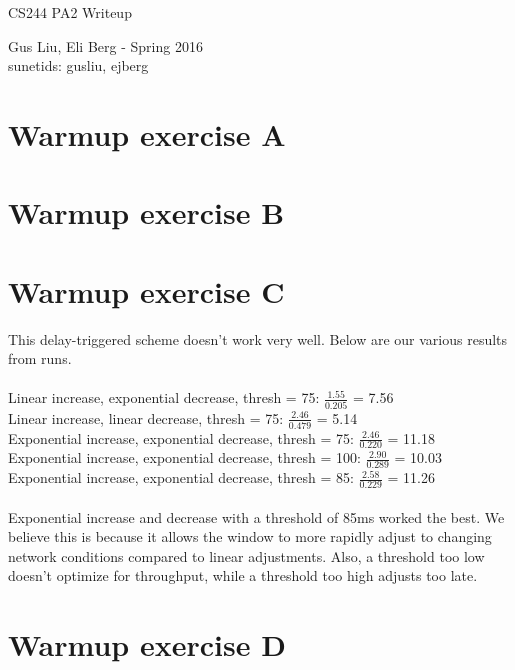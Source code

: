 \documentclass[12pt]{article}
\begin{document}
\begin{center}
{\Large CS244 PA2 Writeup}
\begin{center}
Gus Liu, Eli Berg - Spring 2016 \\
sunetids: gusliu, ejberg
\end{center} 
\end{center}

\section*{Warmup exercise A}
	
	
\section*{Warmup exercise B}
	
	
\section*{Warmup exercise C}
	This delay-triggered scheme doesn't work very well. Below are our various results from runs.
\\
\\
Linear increase, exponential decrease, thresh = 75: $\frac{1.55}{0.205}$ = 7.56 \\
Linear increase, linear decrease, thresh =  75: $\frac{2.46}{0.479}$ = 5.14 \\
Exponential increase, exponential decrease, thresh =  75: $\frac{2.46}{0.220}$ = 11.18 \\
Exponential increase, exponential decrease, thresh =  100: $\frac{2.90}{0.289}$ = 10.03 \\
Exponential increase, exponential decrease, thresh =  85: $\frac{2.58}{0.229}$ = 11.26 \\
\\
Exponential increase and decrease with a threshold of 85ms worked the best. We believe this is because it allows the window to more rapidly adjust to changing network conditions compared to linear adjustments. Also, a threshold too low doesn't optimize for throughput, while a threshold too high adjusts too late. 

\section*{Warmup exercise D}

	
		
\end{document}
